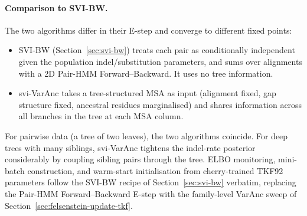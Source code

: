 \paragraph{Comparison to SVI-BW.}
The two algorithms differ in their E-step and converge to different
fixed points:
\begin{itemize}[nosep]
\item SVI-BW (Section~\ref{sec:svi-bw}) treats each pair as
  conditionally independent given the population indel/substitution
  parameters, and sums over alignments with a 2D Pair-HMM
  Forward--Backward.  It uses no tree information.
\item svi-VarAnc takes a tree-structured MSA as input
  (alignment fixed, gap structure fixed, ancestral residues
  marginalised) and shares information across all branches in the
  tree at each MSA column.
\end{itemize}
For pairwise data (a tree of two leaves), the two algorithms coincide.
For deep trees with many siblings, svi-VarAnc tightens the indel-rate
posterior considerably by coupling sibling pairs through the tree.
ELBO monitoring, mini-batch construction, and warm-start
initialisation from cherry-trained TKF92 parameters follow the SVI-BW
recipe of Section~\ref{sec:svi-bw} verbatim, replacing the
Pair-HMM Forward--Backward E-step with the family-level VarAnc
sweep of Section~\ref{sec:felsenstein-update-tkf}.
